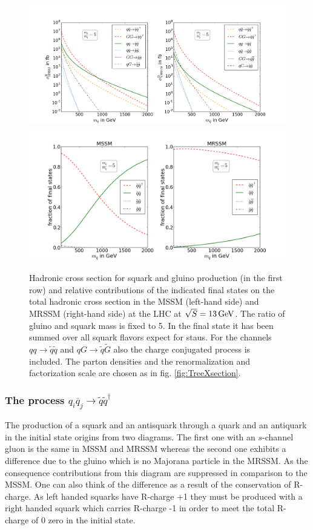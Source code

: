 \begin{figure}[!htpb]
\begin{center}
\includegraphics[scale=.4]{figures/mr=5_MSSM+MRSSM}
\includegraphics[scale=.45]{figures/rel_weights_mr=5_MSSM+MRSSM}
\caption{Hadronic cross section for squark and gluino production (in the first row) and relative contributions of the indicated final states on the total hadronic cross section in the MSSM (left-hand side) and MRSSM (right-hand side) at the LHC at $\sqrt{S} = \unit[13]{GeV}$. The ratio of gluino and squark mass is fixed to 5. In the final state it has been summed over all squark flavors expect for staus. For the channels $qq \to \tilde{q}\tilde{q}$ and $qG \to \tilde{q}\tilde{G}$ also the charge conjugated process is included. The parton densities and the renormalization and factorization scale are chosen as in fig. \ref{fig:TreeXsection}.}
\end{center}
\end{figure}

\subsubsection*{The process $q_i \overline{q}_j \to \tilde{q}\tilde{q}^\dagger$}
The production of a squark and an antisquark through a quark and an antiquark in the initial state origins from two diagrams. The first one with an $s$-channel gluon is the same in MSSM and MRSSM whereas the second one exhibits a difference due to the gluino which is no Majorana particle in the MRSSM. As the consequence contributions from this diagram are suppressed in comparison to the MSSM. One can also think of the difference as a result of the conservation of R-charge. As left handed squarks have R-charge +1 they must be produced with a right handed squark which carries R-charge -1 in order to meet the total R-charge of 0 zero in the initial state.

